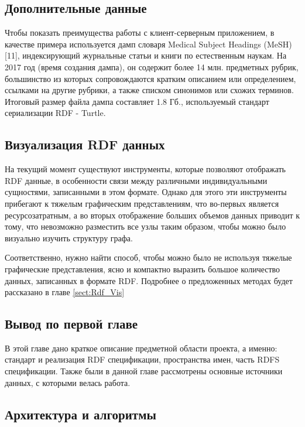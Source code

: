 \documentclass[12pt]{article}
\begin{document}
\subsection{Дополнительные данные}
Чтобы показать преимущества работы с клиент-серверным приложением, в качестве примера используется дамп словаря Medical Subject Headings (MeSH)[11], индексирующий журнальные статьи и книги по естественным наукам. На 2017 год (время создания дампа), он содержит более 14 млн. предметных рубрик, большинство из которых сопровождаются кратким описанием или определением, ссылками на другие рубрики, а также списком синонимов или схожих терминов. Итоговый размер файла дампа составляет 1.8 Гб., используемый стандарт сериализации RDF - Turtle.

\subsection{Визуализация RDF данных}
\qquad На текущий момент существуют инструменты, которые позволяют отображать RDF данные, в особенности связи между различными индивидуальными сущностями, записанными в этом формате. Однако для этого эти инструменты прибегают к тяжелым графическим представлениям, что во-первых является ресурсозатратным, а во вторых отображение больших объемов данных приводит к тому, что невозможно разместить все узлы таким образом, чтобы можно было визуально изучить структуру графа.

Соответственно, нужно найти способ, чтобы можно было не используя тяжелые графические представления, ясно и компактно выразить большое количество данных, записанных в формате RDF. Подробнее о предложенных методах будет рассказано в главе \ref{sect:Rdf_Vis}

\subsection{Вывод по первой главе}
\qquad В этой главе дано краткое описание предметной области проекта, а именно: стандарт и реализация RDF спецификации, пространства имен, часть RDFS спецификации. Также были в данной главе рассмотрены основные источники данных, с которыми велась работа.

\pagebreak

\begin{center}
    {\section{Архитектура и алгоритмы}}
\end{center}
\end{document}
